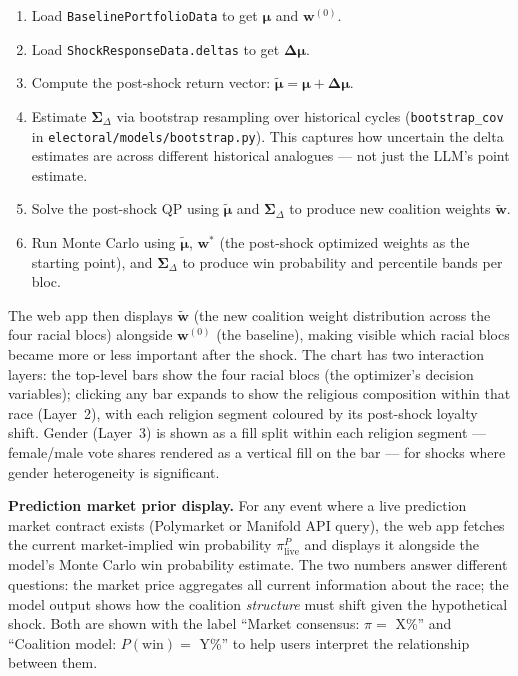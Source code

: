 \documentclass[11pt]{article}
\newcommand{\boldmu}{\boldsymbol{\mu}}
\newcommand{\boldSigma}{\boldsymbol{\Sigma}}
\begin{document}
\begin{enumerate}[leftmargin=2em, itemsep=3pt]
  \item Load \texttt{BaselinePortfolioData} to get $\boldmu$ and $\mathbf{w}^{(0)}$.
  \item Load \texttt{ShockResponseData.deltas} to get $\boldsymbol{\Delta\mu}$.
  \item Compute the post-shock return vector: $\tilde{\boldmu} = \boldmu +
        \boldsymbol{\Delta\mu}$.
  \item Estimate $\boldSigma_\Delta$ via bootstrap resampling over historical cycles
        (\texttt{bootstrap\_cov} in \texttt{electoral/models/bootstrap.py}).
        This captures how uncertain the delta estimates are across different historical
        analogues --- not just the LLM's point estimate.
  \item Solve the post-shock QP using $\tilde{\boldmu}$ and $\boldSigma_\Delta$
        to produce new coalition weights $\tilde{\mathbf{w}}$.
  \item Run Monte Carlo using $\tilde{\boldmu}$, $\mathbf{w}^*$ (the post-shock
        optimized weights as the starting point), and $\boldSigma_\Delta$ to produce
        win probability and percentile bands per bloc.
\end{enumerate}

The web app then displays $\tilde{\mathbf{w}}$ (the new coalition weight distribution
across the four racial blocs) alongside $\mathbf{w}^{(0)}$ (the baseline), making
visible which racial blocs became more or less important after the shock.
The chart has two interaction layers: the top-level bars show the four racial blocs
(the optimizer's decision variables); clicking any bar expands to show the religious
composition within that race (Layer~2), with each religion segment coloured by its
post-shock loyalty shift. Gender (Layer~3) is shown as a fill split within each
religion segment --- female/male vote shares rendered as a vertical fill on the bar
--- for shocks where gender heterogeneity is significant.

\textbf{Prediction market prior display.} For any event where a live prediction
market contract exists (Polymarket or Manifold API query), the web app fetches the
current market-implied win probability $\pi^{P}_{\mathrm{live}}$ and displays it
alongside the model's Monte Carlo win probability estimate. The two numbers answer
different questions: the market price aggregates all current information about the
race; the model output shows how the coalition \emph{structure} must shift given
the hypothetical shock. Both are shown with the label ``Market consensus:
$\pi = $ X\%'' and ``Coalition model: $P(\text{win}) = $ Y\%'' to help users
interpret the relationship between them.
\end{document}
